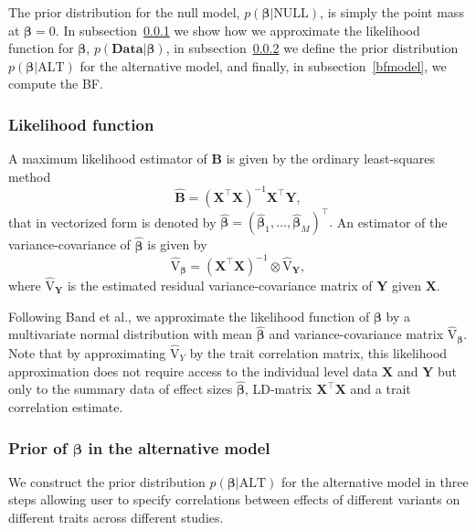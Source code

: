 \documentclass{nature}
\def\bs{\boldsymbol}
\def\Vy{\widehat{\textrm{V}}_Y}
\begin{document}
The prior distribution for the null model, $p\left({\bs {\beta}}|\textrm{NULL}\right)$, is simply the point mass at $\bs \beta = 0$.
In subsection~\ref{approxlikelihood} we show how we approximate the likelihood function for $\bs \beta$, $p\left(\mathbf{\textrm{Data}} | {\bs {\beta}}\right)$,
in subsection~\ref{prioralt} we define the prior distribution $p\left({\bs {\beta}}|\textrm{ALT}\right)$ for the alternative model, 
and finally, in subsection~\ref{bfmodel}, we compute the BF.

\subsubsection{Likelihood function} 
\label{approxlikelihood}
\noindent A maximum likelihood estimator of $\mathbf{\textrm{B}}$ is given by the ordinary least-squares method
$$\widehat{\mathbf{\textrm{B}}} = \left(\mathbf{\textrm{X}}^\intercal\mathbf{\textrm{X}}\right)^{-1}\mathbf{\textrm{X}}^{\intercal}\mathbf{\textrm{Y}},$$
that in vectorized form is denoted by   
$\bs {\widehat{ \beta}} = \left(\bs {\widehat{ \beta}}_{1},\dots,\bs {\widehat{\beta}}_{M}\right)^{\intercal}.$
An estimator of the variance-covariance of $\widehat{\bs \beta}$  is given by 
$$\widehat{\textrm{V}}_{\mathbf{\bs \beta}} =  \left(\mathbf{\textrm{X}}^\intercal\mathbf{\textrm{X}}\right)^{-1}\otimes \widehat{\textrm{V}}_{\mathbf{\textrm{Y}}},$$
where $\widehat{\textrm{V}}_{\mathbf{\textrm{Y}}}$ is the estimated residual variance-covariance matrix of $\mathbf{\textrm{Y}}$ given $\mathbf{\textrm{X}}$. 

\noindent 
Following Band et al.\cite{band2013imputation}, we approximate the likelihood function of $\bs {\beta}$ by a multivariate normal distribution with mean $\bs {\widehat{\beta}}$ and variance-covariance matrix $\widehat{\textrm{V}}_{\bs {\beta}}$. Note that by approximating $\Vy$ by the trait correlation matrix, this likelihood approximation does not require access to the individual level data $\mathbf{\textrm{X}}$ and $\mathbf{\textrm{Y}}$ but only to the 
summary data of effect sizes $\bs {\widehat{\beta}}$, LD-matrix $\mathbf{\textrm{X}}^\intercal\mathbf{\textrm{X}}$ and a trait correlation estimate.


\subsubsection{Prior of $\bs{\beta}$ in the alternative model} 
\label{prioralt}
\noindent We construct the prior distribution $p\left({\bs {\beta}} | \textrm{ALT} \right)$ for the alternative model in three steps allowing 
user to specify correlations between effects of different variants on different traits across different studies.
\end{document}
